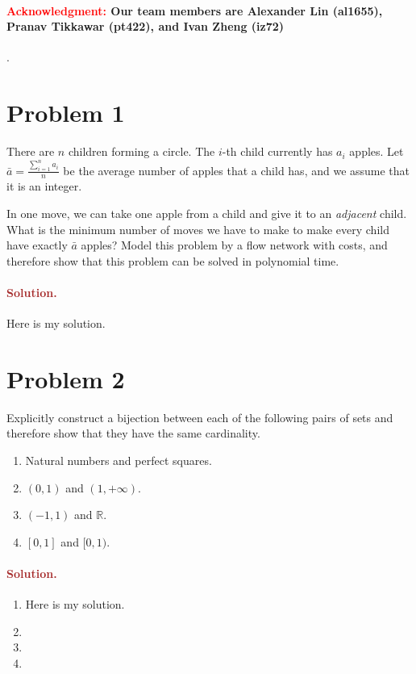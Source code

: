 \paragraph{\textcolor{red}{Acknowledgment:} Our team members are \textbf{Alexander Lin (al1655)}, \textbf{Pranav Tikkawar (pt422)}, and \textbf{Ivan Zheng (iz72)}}.


\section*{Problem 1}
There are $n$ children forming a circle. The $i$-th child currently has $a_i$ apples. Let $\bar a = \frac{\sum_{i = 1}^n a_i}{n}$ be the average number of apples that a child has, and we assume that it is an integer.

In one move, we can take one apple from a child and give it to an \emph{adjacent} child. What is the minimum number of moves we have to make to make every child have exactly $\bar a$ apples? Model this problem by a flow network with costs, and therefore show that this problem can be solved in polynomial time.

\paragraph{\textcolor{brown}{Solution.}}
Here is my solution.


\section*{Problem 2}
Explicitly construct a bijection between each of the following pairs of sets and therefore show that they have the same cardinality.
\begin{enumerate}
    \item Natural numbers and perfect squares.
    \item $(0, 1)$ and $(1, +\infty)$.
    \item $(-1, 1)$ and $\mathbb{R}$.
    \item $[0, 1]$ and $[0, 1)$.
\end{enumerate}


\paragraph{\textcolor{brown}{Solution.}}
\begin{enumerate}
    \item Here is my solution.
    \item 
    \item 
    \item 
\end{enumerate}



